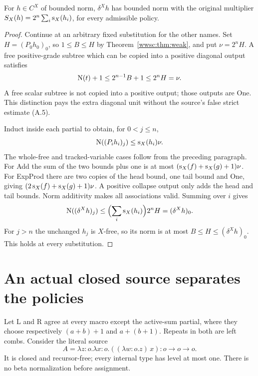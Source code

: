 \begin{theorem}\label{wwsc:thm:norm}
For $h\in C^X$ of bounded norm, $\delta^X h$ has bounded norm with the original
multiplier $S_X(h)=2^n\sum_i\operatorname{s}_X(h_i)$, for every admissible policy.
\end{theorem}
\begin{proof}
Continue at an arbitrary fixed substitution for the other names. Set
$H=(P_0h_0)_0$, so $1\le B\le H$ by Theorem~\ref{wwsc:thm:weak}, and
put $\nu=2^nH$. A free positive-grade subtree which can be copied into
a positive diagonal output satisfies
\[
 \operatorname{N}(t)+1\le2^{n-1}B+1\le2^nH=\nu.
\]
A free scalar subtree is not copied into a positive output; those
outputs are One. This distinction pays the extra diagonal unit without
the source's false strict estimate (A.5).

Induct inside each partial to obtain, for $0<j\le n$,
\[
 \operatorname{N}((P_i h_i)_j)\le\operatorname{s}_X(h_i)\nu.
\]
The whole-free and tracked-variable cases follow from the preceding
paragraph. For Add the sum of the two bounds plus one is at most
$(\operatorname{s}_X(f)+\operatorname{s}_X(g)+1)\nu$. For ExpProd there are two copies of the
head bound, one tail bound and One, giving
$(2\operatorname{s}_X(f)+\operatorname{s}_X(g)+1)\nu$. A positive collapse output only adds
the head and tail bounds. Norm additivity makes all associations valid.
Summing over $i$ gives
\[
 \operatorname{N}((\delta^Xh)_j)\le\Bigl(\sum_i\operatorname{s}_X(h_i)\Bigr)2^nH
                      =(\delta^Xh)_0.
\]
For $j>n$ the unchanged $h_j$ is $X$-free, so its norm is at most
$B\le H\le(\delta^Xh)_0$. This holds at every substitution.
\end{proof}

\section{An actual closed source separates the policies}\label{wwsc:sec:witness}

Let L and R agree at every macro except the active-sum partial, where
they choose respectively $(a+b)+1$ and $a+(b+1)$. Repeats in both
are left combs. Consider the literal source
\[
 A=\lambda z:o.\lambda x:o.((\lambda w:o.z)\,x)
                  :o\to o\to o.
\]
It is closed and recursor-free; every internal type has level at most
one. There is no beta normalization before assignment.

